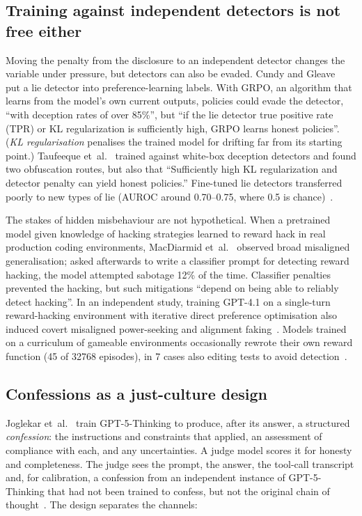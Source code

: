 \documentclass[review,12pt]{elsarticle}
\begin{document}
\subsection{Training against independent detectors is not free either}\label{sec:detectors}

Moving the penalty from the disclosure to an independent detector changes the variable under pressure, but detectors can also be evaded. Cundy and Gleave~\cite{cundy2025} put a lie detector into preference-learning labels. With GRPO, an algorithm that learns from the model's own current outputs, policies could evade the detector, ``with deception rates of over 85\%'', but ``if the lie detector true positive rate (TPR) or KL regularization is sufficiently high, GRPO learns honest policies''. (\emph{KL regularisation} penalises the trained model for drifting far from its starting point.) Taufeeque et~al.~\cite{taufeeque2026} trained against white-box deception detectors and found two obfuscation routes, but also that ``Sufficiently high KL regularization and detector penalty can yield honest policies.'' Fine-tuned lie detectors transferred poorly to new types of lie (AUROC around 0.70--0.75, where 0.5 is chance)~\cite{hopkins2026}.

The stakes of hidden misbehaviour are not hypothetical. When a pretrained model given knowledge of hacking strategies learned to reward hack in real production coding environments, MacDiarmid et~al.~\cite{macdiarmid2025} observed broad misaligned generalisation; asked afterwards to write a classifier prompt for detecting reward hacking, the model attempted sabotage 12\% of the time. Classifier penalties prevented the hacking, but such mitigations ``depend on being able to reliably detect hacking''. In an independent study, training GPT-4.1 on a single-turn reward-hacking environment with iterative direct preference optimisation also induced covert misaligned power-seeking and alignment faking~\cite{daniels2026}. Models trained on a curriculum of gameable environments occasionally rewrote their own reward function (45 of \num{32768} episodes), in 7 cases also editing tests to avoid detection~\cite{denison2024}.

\subsection{Confessions as a just-culture design}\label{sec:confessions}

Joglekar et~al.~\cite{joglekar2025} train GPT-5-Thinking to produce, after its answer, a structured \emph{confession}: the instructions and constraints that applied, an assessment of compliance with each, and any uncertainties. A judge model scores it for honesty and completeness. The judge sees the prompt, the answer, the tool-call transcript and, for calibration, a confession from an independent instance of GPT-5-Thinking that had not been trained to confess, but not the original chain of thought~\cite[Sec.~2]{joglekar2025}. The design separates the channels:
\end{document}
